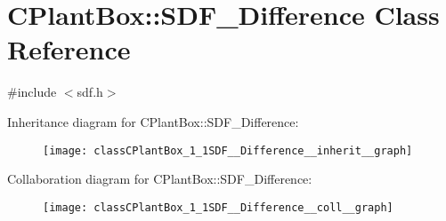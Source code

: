 \hypertarget{classCPlantBox_1_1SDF__Difference}{}\section{C\+Plant\+Box\+:\+:S\+D\+F\+\_\+\+Difference Class Reference}
\label{classCPlantBox_1_1SDF__Difference}


{\ttfamily \#include $<$sdf.\+h$>$}



Inheritance diagram for C\+Plant\+Box\+:\+:S\+D\+F\+\_\+\+Difference\+:\nopagebreak
\begin{figure}[H]
\begin{center}
\leavevmode
\texttt{[image: classCPlantBox\_1\_1SDF\_\_Difference\_\_inherit\_\_graph]}
\end{center}
\end{figure}


Collaboration diagram for C\+Plant\+Box\+:\+:S\+D\+F\+\_\+\+Difference\+:\nopagebreak
\begin{figure}[H]
\begin{center}
\leavevmode
\texttt{[image: classCPlantBox\_1\_1SDF\_\_Difference\_\_coll\_\_graph]}
\end{center}
\end{figure}
